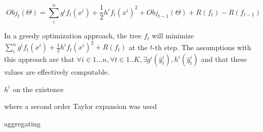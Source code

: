 \[
Obj_t(\Theta) = \sum_i^n {  g^i f_t(x^i) + \frac{1}{2} h^i f_t(x^i)^2 } +  Obj_{t-1}(\Theta) + R(f_t) - R(f_{t-1})
\]

In a greedy optimization approach, the tree $f_t$ will minimize $\sum_i^n {  g^i f_t(x^i) + \frac{1}{2} h^i f_t(x^i)^2 } + R(f_t)$ at the $t$-th step. The assumptions with this approach are that $ \forall i \in {1...n}, \forall t \in {1..K}, \exists g^i(\hat{y}_{t}^i), h^i(\hat{y}_{t}^i) $ and that these values are effectively computable.

$h^i$ on the existence 

where a second order Taylor expansion was used 

aggregating 








